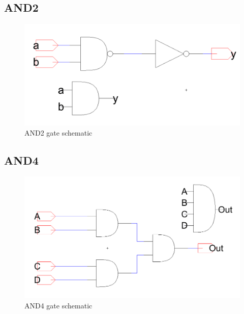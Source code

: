 \documentclass[12pt]{report}
\begin{document}
\subsection*{AND2}
\begin{figure}[H]
  \centering
    \includegraphics[width=1.0\textwidth]{Schematics/and_gate_schematic.PNG}
  \caption{AND2 gate schematic}
  \label{fig:and_gate_schematic}
\end{figure}

\subsection*{AND4}
\begin{figure}[H]
  \centering
    \includegraphics[width=1.0\textwidth]{Schematics/and4_gate_schematic.PNG}
  \caption{AND4 gate schematic}
  \label{fig:and4_gate_schematic}
\end{figure}
\end{document}
